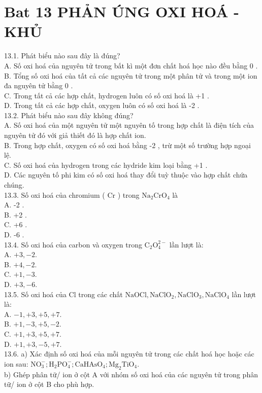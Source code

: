 \documentclass[10pt]{article}
\begin{document}
\section*{Bat 13 PHẢN ÚNG OXI HOÁ - KHỦ}
13.1. Phát biểu nào sau đây là đúng?\\
A. Số oxi hoá của nguyên tử trong bất kì một đơn chất hoá học nào đều bằng 0 .\\
B. Tổng số oxi hoá của tất cả các nguyên tử trong một phân tử và trong một ion đa nguyên tử bằng 0 .\\
C. Trong tất cả các hợp chất, hydrogen luôn có số oxi hoá là +1 .\\
D. Trong tất cả các hợp chất, oxygen luôn có số oxi hoá là -2 .\\
13.2. Phát biểu nào sau đây không đúng?\\
A. Số oxi hoá của một nguyên tử một nguyên tố trong hợp chất là điện tích của nguyên tử đó với giả thiết đó là hợp chất ion.\\
B. Trong hợp chất, oxygen có số oxi hoá bằng -2 , trừ một số trường hợp ngoại lệ.\\
C. Số oxi hoá của hydrogen trong các hydride kim loại bằng +1 .\\
D. Các nguyên tố phi kim có số oxi hoá thay đổi tuỳ thuộc vào hợp chất chứa chúng.\\
13.3. Số oxi hoá của chromium ( Cr ) trong $\mathrm{Na}_{2} \mathrm{CrO}_{4}$ là\\
A. -2 .\\
B. +2 .\\
C. +6 .\\
D. -6 .\\
13.4. Số oxi hoá của carbon và oxygen trong $\mathrm{C}_{2} \mathrm{O}_{4}^{2-}$ lần lượt là:\\
A. $+3,-2$.\\
B. $+4,-2$.\\
C. $+1,-3$.\\
D. $+3,-6$.\\
13.5. Số oxi hoá của Cl trong các chất $\mathrm{NaOCl}, \mathrm{NaClO}_{2}, \mathrm{NaClO}_{3}, \mathrm{NaClO}_{4}$ lần lượt là:\\
A. $-1,+3,+5,+7$.\\
B. $+1,-3,+5,-2$.\\
C. $+1,+3,+5,+7$.\\
D. $+1,+3,-5,+7$.\\
13.6. a) Xác định số oxi hoá của mỗi nguyên tử trong các chất hoá học hoặc các ion sau: $\mathrm{NO}_{3}^{-} ; \mathrm{H}_{2} \mathrm{PO}_{4}^{-} ; \mathrm{CaHAsO}_{4} ; \mathrm{Mg}_{2} \mathrm{TiO}_{4}$.\\
b) Ghép phân tữ/ ion ở cột A với nhóm số oxi hoá của các nguyên tử trong phân tữ/ ion ở cột B cho phù hợp.
\end{document}
